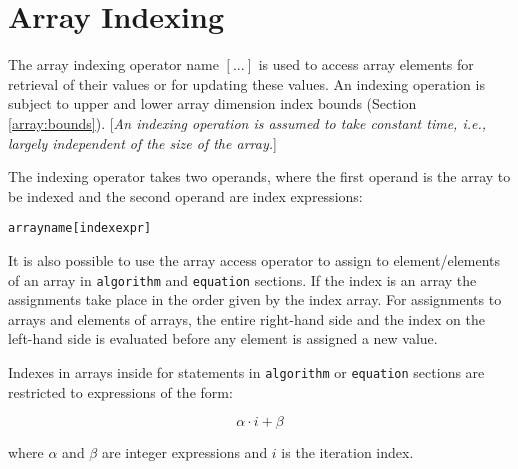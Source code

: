 \documentclass[11pt,a4paper,notitlepage]{report}
\begin{document}
\section{Array Indexing}

The array indexing operator name $[ ... ]$ is used to access array elements for retrieval of their values or for updating these values. An indexing operation is subject to upper and lower array dimension index bounds (Section \ref{array:bounds}). [\emph{An indexing operation is assumed to take constant time, i.e., largely independent of the size of the array.}] 

The indexing operator takes two operands, where the first operand is the array to be indexed and the second operand are index expressions:

\verb"arrayname[indexexpr]"

It is also possible to use the array access operator to assign to element/elements of an array in \verb"algorithm" and \verb"equation" sections. If the index is an array the assignments take place in the order given by the index array. For assignments to arrays and elements of arrays, the entire right-hand side and the index on the left-hand side is evaluated before any element is assigned a new value.

Indexes in arrays inside for statements in \verb"algorithm" or \verb"equation" sections are restricted to expressions of the form:

\begin{equation*}
\alpha \cdot i + \beta
\end{equation*}

where $\alpha$ and $\beta$ are integer expressions and $i$ is the iteration index.
\end{document}
